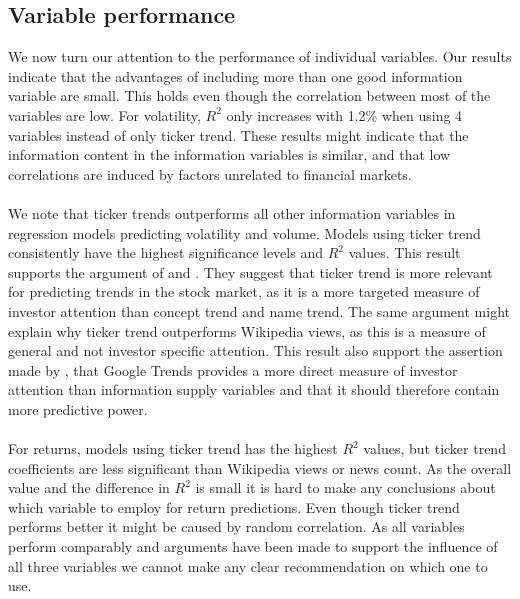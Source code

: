 \subsection{Variable performance}
We now turn our attention to the performance of individual variables. Our results indicate that the advantages of including more than one good information variable are small. This holds even though the correlation between most of the variables are low. For volatility, $R^2$ only increases with 1.2\% when using 4 variables instead of only ticker trend. These results might indicate that the information content in the information variables is similar, and that low correlations are induced by factors unrelated to financial markets. 
\\\\
We note that ticker trends outperforms all other information variables in regression models predicting volatility and volume. Models using ticker trend consistently have the highest significance levels and $R^2$ values. This result supports the argument of \cite{engelberg} and \cite{joseph}. They suggest that ticker trend is more relevant for predicting trends in the stock market, as it is a more targeted measure of investor attention than concept trend and name trend. The same argument might explain why ticker trend outperforms Wikipedia views, as this is a measure of general and not investor specific attention. This result also support the assertion made by \cite{engelberg}, that Google Trends provides a more direct measure of investor attention than information supply variables and that it should therefore contain more predictive power. 
\\\\
For returns, models using ticker trend has the highest $R^2$ values, but ticker trend coefficients are less significant than Wikipedia views or news count. As the overall value and the difference in $R^2$ is small it is hard to make any conclusions about which variable to employ for return predictions. Even though ticker trend performs better it might be caused by random correlation. As all variables perform comparably and arguments have been made to support the influence of all three variables we cannot make any clear recommendation on which one to use. 
\\\\
